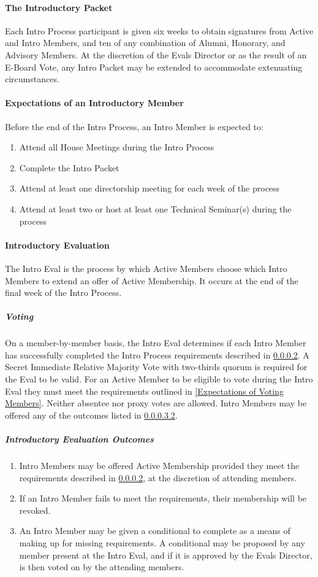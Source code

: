 \documentclass{article}
\newcommand{\asubsubsection}[1]{\paragraph{#1} \label{#1}}
\newcommand{\asubsubsubsection}[1]{\subparagraph{#1} \label{#1}}
\begin{document}
\asubsubsection{The Introductory Packet}
Each Intro Process participant is given six weeks to obtain signatures from Active and Intro Members, and ten of any combination of Alumni, Honorary, and Advisory Members.
At the discretion of the Evals Director or as the result of an E-Board Vote, any Intro Packet may be extended to accommodate extenuating circumstances.

\asubsubsection{Expectations of an Introductory Member}
\renewcommand{\theenumi}{\arabic{enumi}} %
Before the end of the Intro Process, an Intro Member is expected to:
\begin{enumerate}
	\item Attend all House Meetings during the Intro Process
	\item Complete the Intro Packet
	\item Attend at least one directorship meeting for each week of the process
	\item Attend at least two or host at least one Technical Seminar(s) during the process
\end{enumerate}

\asubsubsection{Introductory Evaluation}
The Intro Eval is the process by which Active Members choose which Intro Members to extend an offer of Active Membership.
It occurs at the end of the final week of the Intro Process.

\asubsubsubsection{Voting}
On a member-by-member basis, the Intro Eval determines if each Intro Member has successfully completed the Intro Process requirements described in \ref{Expectations of an Introductory Member}.
A Secret Immediate Relative Majority Vote with two-thirds quorum is required for the Eval to be valid.
For an Active Member to be eligible to vote during the Intro Eval they must meet the requirements outlined in \ref{Expectations of Voting Members}.
Neither absentee nor proxy votes are allowed.
Intro Members may be offered any of the outcomes listed in \ref{Introductory Evaluation Outcomes}.

\asubsubsubsection{Introductory Evaluation Outcomes}
\renewcommand{\theenumi}{\alph{enumi}} %
\begin{enumerate}
	\item Intro Members may be offered Active Membership provided they meet the requirements described in \ref{Expectations of an Introductory Member}, at the discretion of attending members.
	\item If an Intro Member fails to meet the requirements, their membership will be revoked.
	\item An Intro Member may be given a conditional to complete as a means of making up for missing requirements.
	      A conditional may be proposed by any member present at the Intro Eval, and if it is approved by the Evals Director, is then voted on by the attending members.
\end{enumerate}
\end{document}
